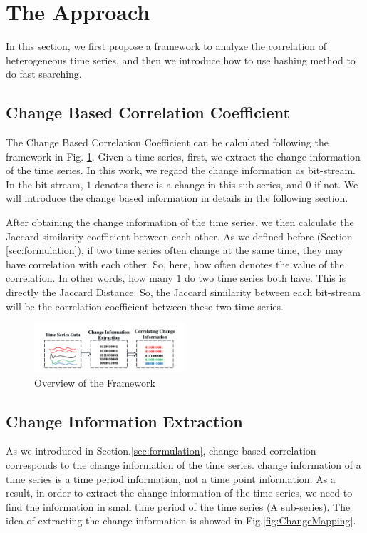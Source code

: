 \section{The Approach}
\label{sec:framework}
In this section, we first propose a framework to analyze the correlation of heterogeneous time series, and then we introduce how to use hashing method to do fast searching.

\subsection{Change Based Correlation Coefficient}

The Change Based Correlation Coefficient can be calculated following the framework in Fig. \ref{fig:frame}.
Given a time series, first, we extract the change information of the time series. 
In this work, we regard the change information as bit-stream. In the bit-stream, $1$ denotes there is a change in this sub-series, and $0$ if not. We will introduce the change based information in details in the following section.

After obtaining the change information of the time series, we then calculate the Jaccard similarity\cite{han2011data} coefficient between each other.
As we defined before (Section \ref{sec:formulation}), if two time series often change at the same time, they may have correlation with each other. 
So, here, how often denotes the value of the correlation. In other words, how many $1$ do two time series both have. This is directly the Jaccard Distance.
So, the Jaccard similarity between each bit-stream will be the correlation coefficient between these two time series. 


\begin{figure}[t]
\centering
\includegraphics[width=0.5\textwidth]{framework.pdf}
\caption{Overview of the Framework}
\label{fig:frame}
\end{figure}

\subsection{Change Information Extraction}
\label{ChangeCorrelation}

As we introduced in Section.\ref{sec:formulation}, change based correlation corresponds to the change information of the time series. change information of a time series is a time period information, not a time point information. 
As a result, in order to extract the change information of the time series, we need to find the information in small time period of the time series (A sub-series). The idea of extracting the change information is showed in Fig.\ref{fig:ChangeMapping}.

